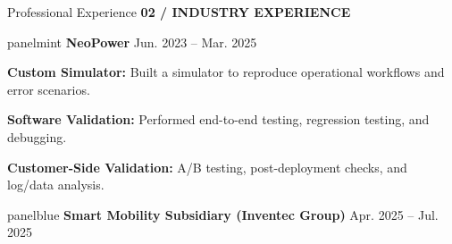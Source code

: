 \documentclass[aspectratio=169,10pt]{beamer}
\newcommand{\smalllabel}[1]{{\scriptsize\bfseries\color{Accent}\MakeUppercase{#1}}}
\begin{document}
\begin{frame}{Professional Experience}
  \vspace{-0.06cm}
  \smalllabel{02 / Industry Experience}\par\vspace{0.10cm}
  \vspace{0.06cm}
  \begin{beamercolorbox}[rounded=true,sep=0.17cm,wd=\linewidth]{panelmint}
    {\normalsize\bfseries\color{Ink}NeoPower}\hfill
    {\scriptsize\color{Muted}Jun. 2023 -- Mar. 2025}\par
    \par\vspace{0.13cm}
    {\small\color{Ink}\textbf{Custom Simulator:} Built a simulator to reproduce operational workflows and error scenarios.}\par\vspace{0.07cm}
    {\small\color{Ink}\textbf{Software Validation:} Performed end-to-end testing, regression testing, and debugging.}\par\vspace{0.07cm}
    {\small\color{Ink}\textbf{Customer-Side Validation:} A/B testing, post-deployment checks, and log/data analysis.}\par
  \end{beamercolorbox}
  \vspace{0.10cm}
  \begin{beamercolorbox}[rounded=true,sep=0.17cm,wd=\linewidth]{panelblue}
    {\normalsize\bfseries\color{Ink}Smart Mobility Subsidiary (Inventec Group)}\hfill
    {\scriptsize\color{Muted}Apr. 2025 -- Jul. 2025}\par
    \par
  \end{beamercolorbox}
\end{frame}
\end{document}
